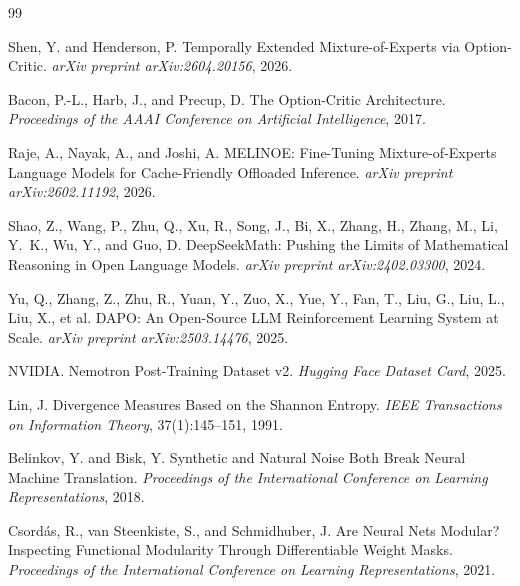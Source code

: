 \documentclass{article}
\begin{document}

\begin{thebibliography}{99}

Shen, Y. and Henderson, P.
\newblock Temporally Extended Mixture-of-Experts via Option-Critic.
\newblock \emph{arXiv preprint arXiv:2604.20156}, 2026.

Bacon, P.-L., Harb, J., and Precup, D.
\newblock The Option-Critic Architecture.
\newblock \emph{Proceedings of the AAAI Conference on Artificial Intelligence}, 2017.

Raje, A., Nayak, A., and Joshi, A.
\newblock MELINOE: Fine-Tuning Mixture-of-Experts Language Models for Cache-Friendly Offloaded Inference.
\newblock \emph{arXiv preprint arXiv:2602.11192}, 2026.

Shao, Z., Wang, P., Zhu, Q., Xu, R., Song, J., Bi, X., Zhang, H., Zhang, M., Li, Y.~K., Wu, Y., and Guo, D.
\newblock DeepSeekMath: Pushing the Limits of Mathematical Reasoning in Open Language Models.
\newblock \emph{arXiv preprint arXiv:2402.03300}, 2024.

Yu, Q., Zhang, Z., Zhu, R., Yuan, Y., Zuo, X., Yue, Y., Fan, T., Liu, G., Liu, L., Liu, X., et al.
\newblock DAPO: An Open-Source LLM Reinforcement Learning System at Scale.
\newblock \emph{arXiv preprint arXiv:2503.14476}, 2025.

NVIDIA.
\newblock Nemotron Post-Training Dataset v2.
\newblock \emph{Hugging Face Dataset Card}, 2025.

Lin, J.
\newblock Divergence Measures Based on the Shannon Entropy.
\newblock \emph{IEEE Transactions on Information Theory}, 37(1):145--151, 1991.

Belinkov, Y. and Bisk, Y.
\newblock Synthetic and Natural Noise Both Break Neural Machine Translation.
\newblock \emph{Proceedings of the International Conference on Learning Representations}, 2018.

Csord\'as, R., van Steenkiste, S., and Schmidhuber, J.
\newblock Are Neural Nets Modular? Inspecting Functional Modularity Through Differentiable Weight Masks.
\newblock \emph{Proceedings of the International Conference on Learning Representations}, 2021.

\end{thebibliography}
\end{document}
